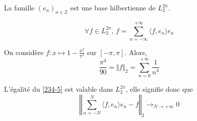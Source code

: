 
	\begin{theorem}
		La famille $(e_n)_{n \in \mathbb{Z}}$ est une base hilbertienne de $L_2^{2 \pi}$.
	\end{theorem}

	\begin{corollary}
		\label{234-5}
		\[ \forall f \in L_2^{2 \pi}, \, f = \sum_{n = -\infty}^{+\infty} \langle f, e_n \rangle e_n \]
	\end{corollary}


	\begin{example}
		On considère $f : x \mapsto 1 - \frac{x^2}{\pi^2}$ sur $[-\pi, \pi]$. Alors,
		\[ \frac{\pi^4}{90} = \Vert f \Vert_2 = \sum_{n=0}^{+\infty} \frac{1}{n^4} \]
	\end{example}


	\begin{remark}
		L'égalité du \cref{234-5} est valable dans $L_2^{2\pi}$, elle signifie donc que
		\[ \left\Vert \sum_{n = -N}^{N} \langle f, e_n \rangle e_n - f \right\Vert_2 \longrightarrow_{N \rightarrow +\infty} 0 \]
	\end{remark}

